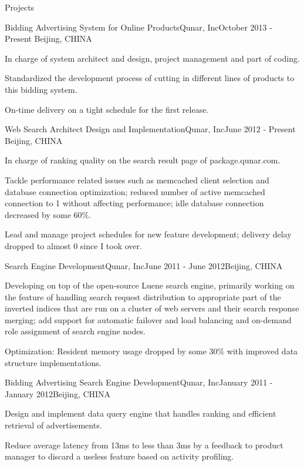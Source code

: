 \documentclass{resume} %
\begin{document}
\begin{rSection}{Projects}

\begin{rSubsection}{Bidding Advertising System for Online Products}{Qunar, Inc}{October 2013 - Present}
{Beijing, CHINA}
\item In charge of system architect and design, project management and part of coding.
\item Standardized the development process of cutting in different lines of products to this bidding system.
\item On-time delivery on a tight schedule for the first release.
\end{rSubsection}

\begin{rSubsection}{Web Search Architect Design and Implementation}{Qunar, Inc}{June 2012 - Present}
{Beijing, CHINA}
\item In charge of ranking quality on the search result page of package.qunar.com.
\item Tackle performance related issues such as memcached client selection and database connection optimization; reduced number of active memcached connection to 1 without affecting performance; idle database connection decreased by some 60\%.
\item Lead and manage project schedules for new feature development; delivery delay dropped to almost 0 since I took over.

\end{rSubsection}

\begin{rSubsection}{Search Engine Development}{Qunar, Inc}{June 2011 -
    June 2012}{Beijing, CHINA}
\item Developing on top of the open-source Luene search engine, primarily working on the feature of handling search
request distribution to appropriate part of the inverted indices that are run on a cluster of web servers and their
search response merging; add support for automatic failover and load balancing and on-demand role
assignment of search engine nodes.
\item Optimization: Resident memory usage dropped by some 30\% with improved data structure implementations.
\end{rSubsection}

\begin{rSubsection}{Bidding Advertising Search Engine
    Development}{Qunar, Inc}{January 2011 -
    January 2012}{Beijing, CHINA}
\item Design and implement data query engine that handles ranking and efficient retrieval of advertisements.
\item Reduce average latency from 13ms to less than 3ms by a feedback to product manager to discard a useless 
feature based on activity profiling. 
\end{rSubsection}

\end{rSection}
\end{document}
